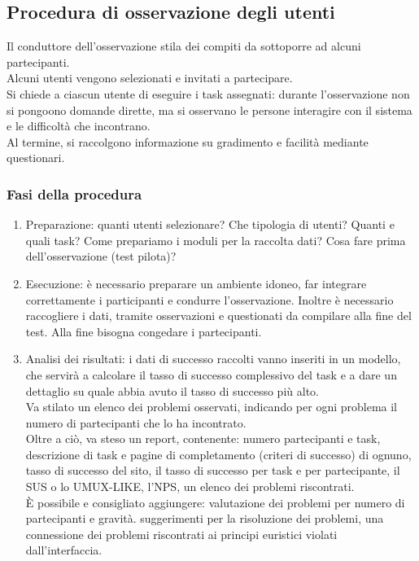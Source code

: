 \documentclass{article}
\begin{document}
\subsection{Procedura di osservazione degli utenti}
Il conduttore dell'osservazione stila dei compiti da sottoporre ad alcuni partecipanti.\\
Alcuni utenti vengono selezionati e invitati a partecipare.\\
Si chiede a ciascun utente di eseguire i task assegnati: durante l'osservazione non si pongoono domande dirette, ma si osservano le persone interagire con il sistema e le difficoltà che incontrano.\\
Al termine, si raccolgono informazione su gradimento e facilità mediante questionari.
\subsubsection{Fasi della procedura}
\begin{enumerate}
	\item Preparazione: quanti utenti selezionare? Che tipologia di utenti? Quanti e quali task? Come prepariamo i moduli per la raccolta dati? Cosa fare prima dell'osservazione (test pilota)?
	\item Esecuzione: è necessario preparare un ambiente idoneo, far integrare correttamente i participanti e condurre l'osservazione. Inoltre è necessario raccogliere i dati, tramite osservazioni e questionati da compilare alla fine del test. Alla fine bisogna congedare i partecipanti.
	\item Analisi dei risultati: i dati di successo raccolti vanno inseriti in un modello, che servirà a calcolare il tasso di successo complessivo del task e a dare un dettaglio su quale abbia avuto il tasso di successo più alto.\\
	Va stilato un elenco dei problemi osservati, indicando per ogni problema il numero di partecipanti che lo ha incontrato. \\
	Oltre a ciò, va steso un report, contenente: numero partecipanti e task, descrizione di task e pagine di completamento (criteri di successo) di ognuno, tasso di successo del sito, il tasso di successo per task e per partecipante, il SUS o lo UMUX-LIKE, l'NPS, un elenco dei problemi riscontrati.\\
	È possibile e consigliato aggiungere: valutazione dei problemi per numero di partecipanti e gravità. suggerimenti per la risoluzione dei problemi, una connessione dei problemi riscontrati ai principi euristici violati dall'interfaccia.
\end{enumerate} 
\end{document}
